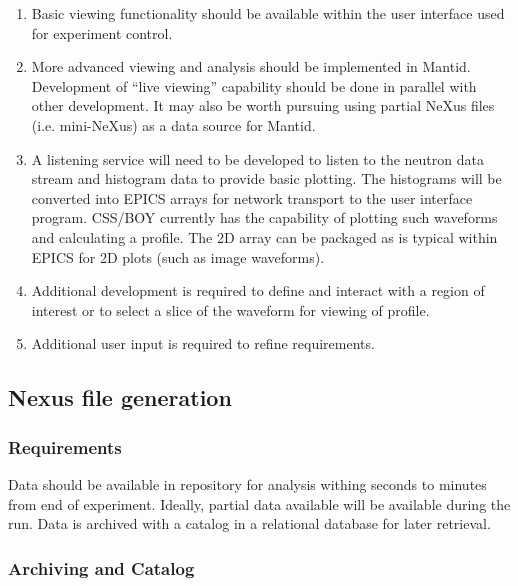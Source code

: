 \begin{enumerate}

\item Basic viewing functionality should be available within the user
interface used for experiment control.

\item More advanced viewing and analysis should be implemented in Mantid.
Development of ``live viewing'' capability should be done in parallel
with other development. It may also be worth pursuing using partial
NeXus files (i.e. mini-NeXus) as a data source for Mantid.

\item A listening service will need to be developed to listen to the
neutron data stream and histogram data to provide basic plotting. The
histograms will be converted into EPICS arrays for network transport
to the user interface program. CSS/BOY currently has the capability of
plotting such waveforms and calculating a profile. The 2D array can
be packaged as is typical within EPICS for 2D plots (such as image
waveforms).

\item Additional development is required to define and interact with
a region of interest or to select a slice of the waveform for viewing
of profile.

\item Additional user input is required to refine requirements.

\end{enumerate}
\subsection{Nexus file generation}
\subsubsection{Requirements}

Data should be available in repository for analysis withing seconds to
minutes from end of experiment. Ideally, partial data available will be
available during the run. Data is archived with a catalog in a relational
database for later retrieval.

\subsubsection{Archiving and Catalog}

